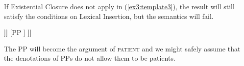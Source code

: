 If Existential Closure does not apply in (\ref{ex3:template3}), the result will still satisfy the conditions on Lexical Insertion, but the semantics will fail.
\begin{exe}
	\raggedright
	\ex \label{ex3:template4} 
	\small
	\begin{forest}
	[VP[\ibar{V}
		[$\lambda x$ $\lambda \epsilon$ \textsc{patient}($x$)($\epsilon$) $\wedge$ \textsc{eat}($\epsilon$)\\ \ibar{V} [$\lambda x$ $\lambda \epsilon$ \textsc{patient}($x$)($\epsilon$) $\wedge$ \textsc{eat}($\epsilon$)=T\\ \obar{V} [eat]]]
		[PP ]
	]]
	\end{forest}
\end{exe}
The PP will become the argument of \textsc{patient} and we might safely assume that the denotations of PPs do not allow them to be patients.

